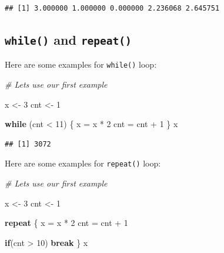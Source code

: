 \documentclass[
]{book}
\newenvironment{Shaded}{\begin{snugshade}}{\end{snugshade}}
\newcommand{\CommentTok}[1]{\textcolor[rgb]{0.56,0.35,0.01}{\textit{#1}}}
\newcommand{\ControlFlowTok}[1]{\textcolor[rgb]{0.13,0.29,0.53}{\textbf{#1}}}
\newcommand{\DecValTok}[1]{\textcolor[rgb]{0.00,0.00,0.81}{#1}}
\newcommand{\NormalTok}[1]{#1}
\newcommand{\OtherTok}[1]{\textcolor[rgb]{0.56,0.35,0.01}{#1}}
\newcommand{\SpecialCharTok}[1]{\textcolor[rgb]{0.00,0.00,0.00}{#1}}
\begin{document}
\begin{verbatim}
## [1] 3.000000 1.000000 0.000000 2.236068 2.645751
\end{verbatim}

\hypertarget{while-and-repeat}{%
\subsection{\texorpdfstring{\texttt{while()} and \texttt{repeat()}}{while() and repeat()}}\label{while-and-repeat}}

Here are some examples for \texttt{while()} loop:

\begin{Shaded}
\begin{Highlighting}[]
\CommentTok{\# Let\textquotesingle{}s use our first example}

\NormalTok{x }\OtherTok{\textless{}{-}} \DecValTok{3}
\NormalTok{cnt }\OtherTok{\textless{}{-}} \DecValTok{1}

\ControlFlowTok{while}\NormalTok{ (cnt }\SpecialCharTok{\textless{}} \DecValTok{11}\NormalTok{) \{}
\NormalTok{   x }\OtherTok{=}\NormalTok{ x }\SpecialCharTok{*} \DecValTok{2}
\NormalTok{   cnt }\OtherTok{=}\NormalTok{ cnt }\SpecialCharTok{+} \DecValTok{1}
\NormalTok{\}}
\NormalTok{x}
\end{Highlighting}
\end{Shaded}

\begin{verbatim}
## [1] 3072
\end{verbatim}

Here are some examples for \texttt{repeat()} loop:

\begin{Shaded}
\begin{Highlighting}[]
\CommentTok{\# Let\textquotesingle{}s use our first example}

\NormalTok{x }\OtherTok{\textless{}{-}} \DecValTok{3}
\NormalTok{cnt }\OtherTok{\textless{}{-}} \DecValTok{1}

\ControlFlowTok{repeat}\NormalTok{ \{}
\NormalTok{   x }\OtherTok{=}\NormalTok{ x }\SpecialCharTok{*} \DecValTok{2}
\NormalTok{   cnt }\OtherTok{=}\NormalTok{ cnt }\SpecialCharTok{+} \DecValTok{1}
  
   \ControlFlowTok{if}\NormalTok{(cnt }\SpecialCharTok{\textgreater{}} \DecValTok{10}\NormalTok{) }\ControlFlowTok{break}
\NormalTok{\}}
\NormalTok{x}
\end{Highlighting}
\end{Shaded}
\end{document}
